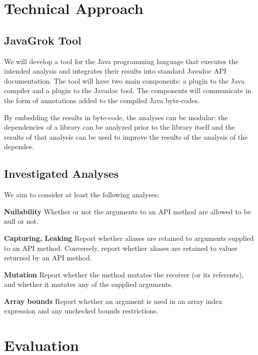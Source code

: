 \documentclass[letterpaper,12pt]{article}
\let\Itemize =\itemize
\def\Nospacing{\itemsep=0pt\topsep=0pt\partopsep=0pt\parskip=0pt\parsep=0pt}
\renewenvironment{itemize}{\Itemize\Nospacing}{\endlist}
\begin{document}
\section{Technical Approach}

\subsection{JavaGrok Tool}

We will develop a tool for the Java programming language that executes the
intended analysis and integrates their results into standard Javadoc API
documentation. The tool will have two main components: a plugin to the Java
compiler and a plugin to the Javadoc tool. The components will communicate in
the form of annotations added to the compiled Java byte-codes.

By embedding the results in byte-code, the analyses can be modular: the
dependencies of a library can be analyzed prior to the library itself and the
results of that analysis can be used to improve the results of the analysis of
the dependee.

\subsection{Investigated Analyses}
We aim to consider at least the following analyses:

\begin{itemize}
\item \textbf{Nullability} Whether or not the arguments to an API method are
  allowed to be null or not.

\item \textbf{Capturing, Leaking} Report whether aliases are retained to
  arguments supplied to an API method. Conversely, report whether aliases are
  retained to values returned by an API method.

\item \textbf{Mutation} Report whether the method mutates the receiver (or its
  referents), and whether it mutates any of the supplied arguments.

\item \textbf{Array bounds} Report whether an argument is used in an array
  index expression and any unchecked bounds restrictions.
\end{itemize}

\section{Evaluation}
\end{document}
